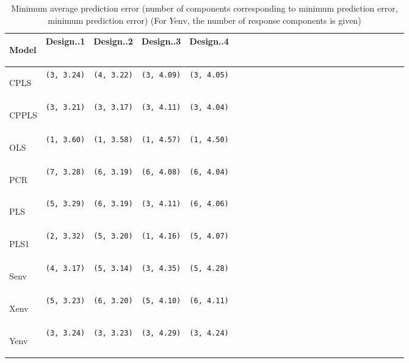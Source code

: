 \documentclass[3p,times,12pt,authoryear]{elsarticle}
\theoremstyle{definition}
\theoremstyle{definition}
\theoremstyle{remark}
\begin{document}
\begin{table}

\caption{\label{tab:min-error}Minimum average prediction error 
      (number of components corresponding to minimum prediction error, minimum prediction error) 
      (For $Y\text{env}$, the number of response components is given)}
\centering
\begin{tabular}[t]{>{\bfseries\raggedright\arraybackslash}p{10em}>{\centering\arraybackslash}p{7em}>{\centering\arraybackslash}p{7em}>{\centering\arraybackslash}p{7em}>{\centering\arraybackslash}p{7em}lcccclcccclcccclcccc}
\toprule
\bfseries{Model} & \bfseries{Design..1} & \bfseries{Design..2} & \bfseries{Design..3} & \bfseries{Design..4}\\
\midrule
CPLS & \texttt{(3, 3.24)} & \texttt{(4, 3.22)} & \texttt{(3, 4.09)} & \texttt{(3, 4.05)}\\
CPPLS & \texttt{(3, 3.21)} & \texttt{(3, 3.17)} & \texttt{(3, 4.11)} & \texttt{(3, 4.04)}\\
OLS & \texttt{(1, 3.60)} & \texttt{(1, 3.58)} & \texttt{(1, 4.57)} & \texttt{(1, 4.50)}\\
PCR & \texttt{(7, 3.28)} & \texttt{(6, 3.19)} & \texttt{(6, 4.08)} & \texttt{(6, 4.04)}\\
PLS & \texttt{(5, 3.29)} & \texttt{(6, 3.19)} & \texttt{(3, 4.11)} & \texttt{(6, 4.06)}\\
\addlinespace
PLS1 & \texttt{(2, 3.32)} & \texttt{(5, 3.20)} & \texttt{(1, 4.16)} & \texttt{(5, 4.07)}\\
Senv & \texttt{(4, 3.17)} & \texttt{(5, 3.14)} & \texttt{(3, 4.35)} & \texttt{(5, 4.28)}\\
Xenv & \texttt{(5, 3.23)} & \texttt{(6, 3.20)} & \texttt{(5, 4.10)} & \texttt{(6, 4.11)}\\
Yenv & \texttt{(3, 3.24)} & \texttt{(3, 3.23)} & \texttt{(3, 4.29)} & \texttt{(3, 4.24)}\\
\bottomrule
\end{tabular}
\end{table}

\end{document}
